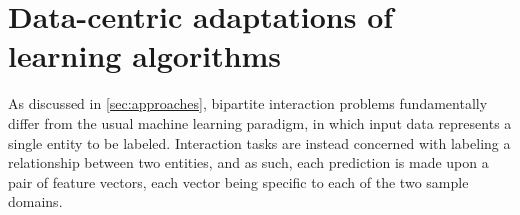 







\section{Data-centric adaptations of learning algorithms}
\label{sec:standard adaptations}

As discussed in \autoref{sec:approaches},
bipartite interaction problems fundamentally differ from the usual machine learning paradigm, in which input data represents a single entity to be labeled. Interaction tasks are instead concerned with labeling a relationship between two entities, and as such, each prediction is made upon a pair of feature vectors, each vector being specific to each of the two sample domains.

